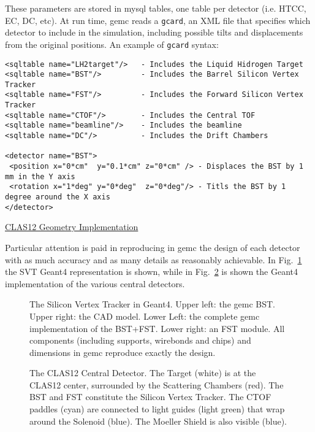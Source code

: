 \noindent
These parameters are stored in mysql tables, one table per detector (i.e. HTCC, EC, DC, etc).
At run time, gemc reads a {\tt gcard}, an XML file that specifies which detector to include in the simulation, including
possible tilts and displacements from the original positions. An example of {\tt gcard} syntax:

\footnotesize
\begin{verbatim}
<sqltable name="LH2target"/>   - Includes the Liquid Hidrogen Target
<sqltable name="BST"/>         - Includes the Barrel Silicon Vertex Tracker
<sqltable name="FST"/>         - Includes the Forward Silicon Vertex Tracker
<sqltable name="CTOF"/>        - Includes the Central TOF
<sqltable name="beamline"/>    - Includes the beamline
<sqltable name="DC"/>          - Includes the Drift Chambers

<detector name="BST">
 <position x="0*cm"  y="0.1*cm" z="0*cm" /> - Displaces the BST by 1 mm in the Y axis
 <rotation x="1*deg" y="0*deg"  z="0*deg"/> - Titls the BST by 1 degree around the X axis
</detector>
\end{verbatim}
\normalsize

\underline{CLAS12 Geometry Implementation}
\vskip 0.5cm

\noindent
Particular attention is paid in reproducing in gemc the design of each detector with as much accuracy and
as many details as reasonably achievable.
In Fig.~\ref{fig:svt} the SVT Geant4 representation is shown, while in Fig.~\ref{fig:central} is shown
the Geant4 implementation of the various central detectors.


\vskip 1cm
\begin{figure}[h]
\begin{center}
\caption{\small{The Silicon Vertex Tracker in Geant4. Upper left: the gemc BST.
               Upper right: the CAD model. Lower Left: the complete gemc implementation of
               the BST+FST. Lower right: an FST module. All components (including supports,
               wirebonds and chips) and dimensions in gemc reproduce exactly the design. }}
\label{fig:svt}
\end{center}
\end{figure}
\clearpage\newpage
\begin{figure}[h]
\begin{center}
\caption{\small{The CLAS12 Central Detector. The Target (white) is at the CLAS12 center,
               surrounded by the Scattering Chambers (red). The BST and FST constitute the
               Silicon Vertex Tracker. The CTOF paddles (cyan) are connected to light guides
               (light green) that wrap around the Solenoid (blue). The Moeller Shield is also
               visible (blue).}}
\label{fig:central}
\end{center}
\end{figure}
\clearpage\newpage


